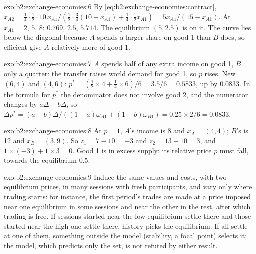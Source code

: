 \begin{solution}{exo:b2:exchange-economies:6}
By \eqref{eq:b2:exchange-economies:contract}, $x_{A2} = \tfrac14 \cdot \tfrac12 \cdot 10\,x_{A1}/(\tfrac12
\cdot \tfrac34 (10 - x_{A1}) + \tfrac14 \cdot \tfrac12 x_{A1}) = 5x_{A1}/(15 - x_{A1})$. At $x_{A1} = 2$,
$5$, $8$: $0.769$, $2.5$, $5.714$. The equilibrium $(5, 2.5)$ is on it. The curve lies below the
diagonal because $A$ spends a larger share on good 1 than $B$ does, so efficient  give $A$
relatively more of good 1.
\end{solution}

\begin{solution}{exo:b2:exchange-economies:7}
$A$ spends half of any extra income on good 1, $B$ only a quarter: the transfer raises world demand for
good 1, so $p$ rises. New  $(6, 4)$ and $(4, 6)$: $p^* = (\tfrac12 \times 4 + \tfrac14 \times
6)/6 = 3.5/6 = 0.5833$, up by $0.0833$. In the formula for $p^*$ the denominator does not involve good 2,
and the numerator changes by $a\Delta - b\Delta$, so $\Delta p^* = (a - b)\Delta/((1 - a)\omega_{A1} + (1
- b)\omega_{B1}) = 0.25 \times 2/6 = 0.0833$.
\end{solution}

\begin{solution}{exo:b2:exchange-economies:8}
At $p = 1$, $A$'s income is 8 and $x_A = (4, 4)$; $B$'s is 12 and $x_B = (3, 9)$. So $z_1 = 7 - 10 = -3$
and $z_2 = 13 - 10 = 3$, and $1 \times (-3) + 1 \times 3 = 0$. Good 1 is in excess supply: its relative
price $p$ must fall, towards the equilibrium $0.5$.
\end{solution}

\begin{solution}{exo:b2:exchange-economies:9}
Induce the same values and costs, with two equilibrium prices, in many sessions with fresh participants,
and vary only where trading starts: for instance, the first period's trades are made at a price imposed
near one equilibrium in some sessions and near the other in the rest, after which trading is free. If
sessions started near the low equilibrium settle there and those started near the high one settle there,
history picks the equilibrium. If all settle at one of them, something outside the model (stability, a
focal point) selects it; the model, which predicts only the set, is not refuted by either result.
\end{solution}

